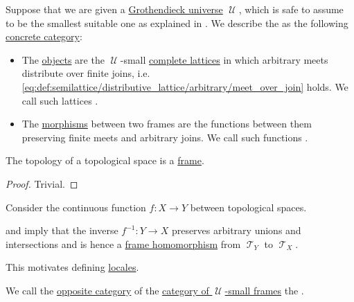 \begin{definition}\label{def:category_of_small_frames}
  Suppose that we are given a \hyperref[def:grothendieck_universe]{Grothendieck universe} \( \mscrU \), which is safe to assume to be the smallest suitable one as explained in . We describe the  as the following \hyperref[rem:concrete_categories]{concrete category}:

  \begin{itemize}
    \item The \hyperref[def:category/objects]{objects} are the \( \mscrU \)-small \hyperref[def:semilattice/complete]{complete lattices} in which arbitrary meets distribute over finite joins, i.e. \eqref{eq:def:semilattice/distributive_lattice/arbitrary/meet_over_join} holds. We call such lattices .

    \item The \hyperref[def:category/morphisms]{morphisms} between two frames are the functions between them preserving finite meets and arbitrary joins. We call such functions .
  \end{itemize}
\end{definition}

\begin{proposition}\label{thm:topological_spaces_are_frames}
  The topology of a topological space is a \hyperref[def:category_of_small_frames]{frame}.
\end{proposition}
\begin{proof}
  Trivial.
\end{proof}

\begin{remark}\label{rem:topology_frame_homomorphism}
  Consider the continuous function \( f: X \to Y \) between topological spaces.

   and  imply that the inverse \( f^{-1}: Y \to X \) preserves arbitrary unions and intersections and is hence a \hyperref[def:category_of_small_frames]{frame homomorphism} from \( \mscrT_Y \) to \( \mscrT_X \).

  This motivates defining \hyperref[def:category_of_small_locales]{locales}.
\end{remark}

\begin{definition}\label{def:category_of_small_locales}
  We call the \hyperref[def:opposite_category]{opposite category} of the \hyperref[def:category_of_small_frames]{category of \( \mscrU \)-small frames} the .
\end{definition}

